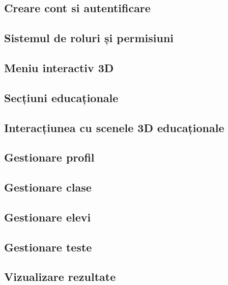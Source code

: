 \subsection{Creare cont si autentificare}
\subsection{Sistemul de roluri și permisiuni}
\subsection{Meniu interactiv 3D}
\subsection{Secțiuni educaționale}
\subsection{Interacțiunea cu scenele 3D educaționale}
\subsection{Gestionare profil}
\subsection{Gestionare clase}
\subsection{Gestionare elevi}
\subsection{Gestionare teste}
\subsection{Vizualizare rezultate}






